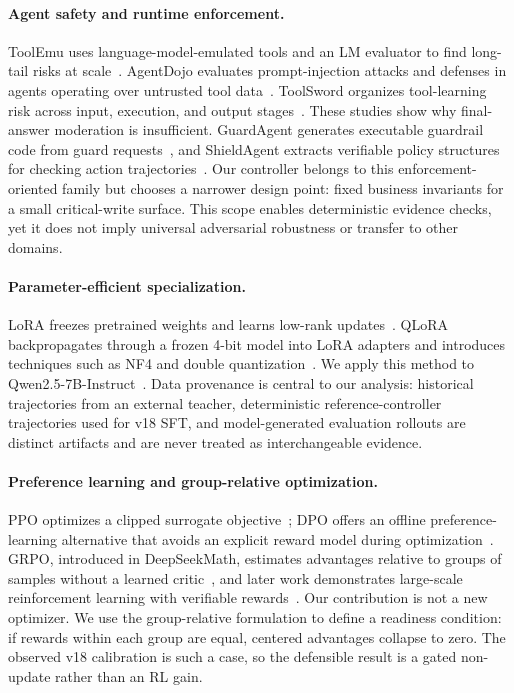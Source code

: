\documentclass[11pt]{article}
\begin{document}
\paragraph{Agent safety and runtime enforcement.}
ToolEmu uses language-model-emulated tools and an LM evaluator to find long-tail risks at scale~\citep{ruan2024toolemu}. AgentDojo evaluates prompt-injection attacks and defenses in agents operating over untrusted tool data~\citep{debenedetti2024agentdojo}. ToolSword organizes tool-learning risk across input, execution, and output stages~\citep{ye2024toolsword}. These studies show why final-answer moderation is insufficient. GuardAgent generates executable guardrail code from guard requests~\citep{xiang2025guardagent}, and ShieldAgent extracts verifiable policy structures for checking action trajectories~\citep{chen2025shieldagent}. Our controller belongs to this enforcement-oriented family but chooses a narrower design point: fixed business invariants for a small critical-write surface. This scope enables deterministic evidence checks, yet it does not imply universal adversarial robustness or transfer to other domains.

\paragraph{Parameter-efficient specialization.}
LoRA freezes pretrained weights and learns low-rank updates~\citep{hu2022lora}. QLoRA backpropagates through a frozen 4-bit model into LoRA adapters and introduces techniques such as NF4 and double quantization~\citep{dettmers2023qlora}. We apply this method to Qwen2.5-7B-Instruct~\citep{qwen2024qwen25}. Data provenance is central to our analysis: historical trajectories from an external teacher, deterministic reference-controller trajectories used for v18 SFT, and model-generated evaluation rollouts are distinct artifacts and are never treated as interchangeable evidence.

\paragraph{Preference learning and group-relative optimization.}
PPO optimizes a clipped surrogate objective~\citep{schulman2017ppo}; DPO offers an offline preference-learning alternative that avoids an explicit reward model during optimization~\citep{rafailov2023dpo}. GRPO, introduced in DeepSeekMath, estimates advantages relative to groups of samples without a learned critic~\citep{shao2024deepseekmath}, and later work demonstrates large-scale reinforcement learning with verifiable rewards~\citep{deepseek2025r1}. Our contribution is not a new optimizer. We use the group-relative formulation to define a readiness condition: if rewards within each group are equal, centered advantages collapse to zero. The observed v18 calibration is such a case, so the defensible result is a gated non-update rather than an RL gain.
\end{document}
